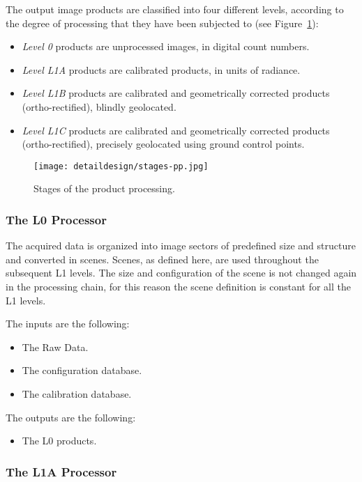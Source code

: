 The output image products are classified into four different levels, according to the degree of processing that they have been subjected to (see Figure~\ref{fig:cloud-states-pp}):
\begin{itemize}

\item \emph{Level 0} products are unprocessed images, in digital count numbers.
\item \emph{Level L1A} products are calibrated products, in units of radiance.
\item \emph{Level L1B} products are calibrated and geometrically corrected products (ortho-rectified), blindly geolocated.
\item \emph{Level L1C} products are calibrated and geometrically corrected products (ortho-rectified), precisely geolocated using ground control points.
\end{itemize}

\begin{figure}[!h]
\begin{center}
\texttt{[image: detaildesign/stages-pp.jpg]}
\caption{Stages of the product processing.}
\label{fig:cloud-states-pp}
\end{center}
\end{figure}

\subsubsection{The L0 Processor}

The acquired data is organized into image sectors of predefined size and structure and converted in scenes. Scenes, as defined here, are used throughout the subsequent L1 levels. The size and configuration of the scene is not changed again in the processing chain, for this reason the scene definition is constant for all the L1 levels.

The inputs are the following:
\begin{itemize}
\item The Raw Data.
\item The configuration database.
\item The calibration database.
\end{itemize}
The outputs are the following:
\begin{itemize}
\item The L0 products.
\end{itemize}

\subsubsection{The L1A Processor}

